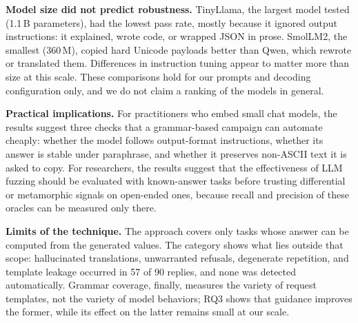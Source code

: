 \textbf{Model size did not predict robustness.} TinyLlama, the largest model tested (1.1\,B parameters), had the lowest pass rate, mostly because it ignored output instructions: it explained, wrote code, or wrapped JSON in prose. SmolLM2, the smallest (360\,M), copied hard Unicode payloads better than Qwen, which rewrote or translated them. Differences in instruction tuning appear to matter more than size at this scale. These comparisons hold for our prompts and decoding configuration only, and we do not claim a ranking of the models in general.

\textbf{Practical implications.} For practitioners who embed small chat models, the results suggest three checks that a grammar-based campaign can automate cheaply: whether the model follows output-format instructions, whether its answer is stable under paraphrase, and whether it preserves non-ASCII text it is asked to copy. For researchers, the results suggest that the effectiveness of LLM fuzzing should be evaluated with known-answer tasks before trusting differential or metamorphic signals on open-ended ones, because recall and precision of these oracles can be measured only there.

\textbf{Limits of the technique.} The approach covers only tasks whose answer can be computed from the generated values. The  category shows what lies outside that scope: hallucinated translations, unwarranted refusals, degenerate repetition, and template leakage occurred in 57 of 90 replies, and none was detected automatically. Grammar coverage, finally, measures the variety of request templates, not the variety of model behaviors; RQ3 shows that guidance improves the former, while its effect on the latter remains small at our scale.
